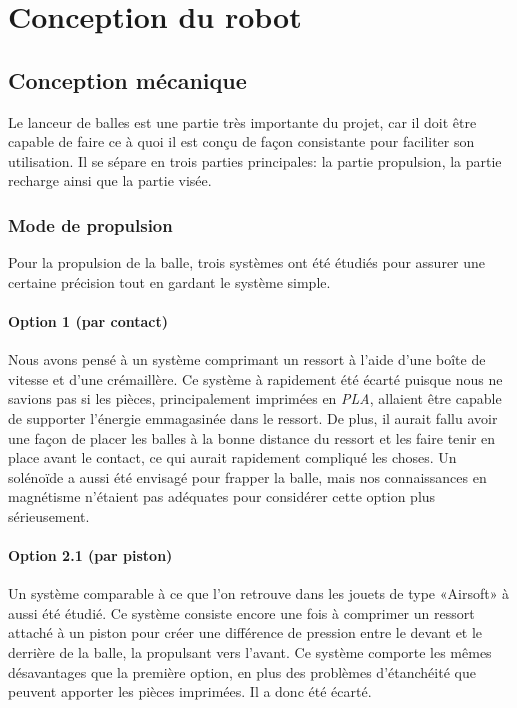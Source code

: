 \section{Conception du robot}

\subsection{Conception mécanique}

Le lanceur de balles est une partie très importante du projet,
car il doit être capable de faire ce à quoi il est conçu de façon consistante pour faciliter son utilisation.
Il se sépare en trois parties principales: la partie propulsion, la partie recharge ainsi que la partie visée.

\subsubsection{Mode de propulsion}
Pour la propulsion de la balle, trois systèmes ont été étudiés pour assurer une certaine précision tout en gardant le système simple.

\paragraph{Option 1 (par contact)}
Nous avons pensé à un système comprimant un ressort à l’aide d’une boîte de vitesse et d’une crémaillère.
Ce système à rapidement été écarté puisque nous ne savions pas si les pièces, principalement imprimées en \emph{PLA}, allaient être capable de supporter l'énergie emmagasinée dans le ressort.
De plus, il aurait fallu avoir une façon de placer les balles à la bonne distance du ressort et les faire tenir en place avant le contact, ce qui aurait rapidement compliqué les choses.
Un solénoïde a aussi été envisagé pour frapper la balle, mais nos connaissances en magnétisme n’étaient pas adéquates pour considérer cette option plus sérieusement.

\paragraph{Option 2.1 (par piston)}
Un système comparable à ce que l’on retrouve dans les jouets de type «Airsoft» à aussi été étudié.
Ce système consiste encore une fois à comprimer un ressort attaché à un piston pour créer une différence de pression entre le devant et le derrière de la balle, la propulsant vers l’avant.
Ce système comporte les mêmes désavantages que la première option, en plus des problèmes d’étanchéité que peuvent apporter les pièces imprimées.
Il a donc été écarté.

